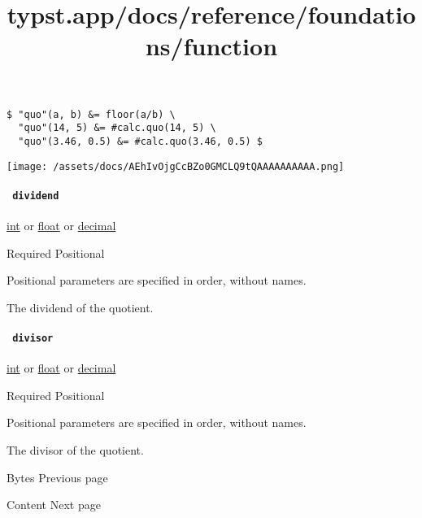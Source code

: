 \begin{verbatim}
$ "quo"(a, b) &= floor(a/b) \
  "quo"(14, 5) &= #calc.quo(14, 5) \
  "quo"(3.46, 0.5) &= #calc.quo(3.46, 0.5) $
\end{verbatim}

\texttt{[image: /assets/docs/AEhIvOjgCcBZo0GMCLQ9tQAAAAAAAAAA.png]}

\paragraph{\texorpdfstring{\texttt{\ dividend\ }}{ dividend }}\label{functions-quo-dividend}

\href{/docs/reference/foundations/int/}{int} {or}
\href{/docs/reference/foundations/float/}{float} {or}
\href{/docs/reference/foundations/decimal/}{decimal}

{Required} {{ Positional }}

\label{functions-quo-dividend-positional-tooltip}
Positional parameters are specified in order, without names.

The dividend of the quotient.

\paragraph{\texorpdfstring{\texttt{\ divisor\ }}{ divisor }}\label{functions-quo-divisor}

\href{/docs/reference/foundations/int/}{int} {or}
\href{/docs/reference/foundations/float/}{float} {or}
\href{/docs/reference/foundations/decimal/}{decimal}

{Required} {{ Positional }}

\label{functions-quo-divisor-positional-tooltip}
Positional parameters are specified in order, without names.

The divisor of the quotient.

\href{/docs/reference/foundations/bytes/}{\pandocbounded{}}

{ Bytes } { Previous page }

\href{/docs/reference/foundations/content/}{\pandocbounded{}}

{ Content } { Next page }


\title{typst.app/docs/reference/foundations/function}

